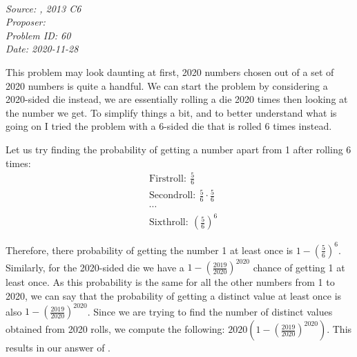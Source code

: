 \SSbreak\\
\emph{Source: \Chmmt, 2013 C6}\\
\emph{Proposer: \Pchan}\\
\emph{Problem ID: 60}\\
\emph{Date: 2020-11-28}\\
\SSbreak

\bigskip 

\begin{solution}\hfil\medskip
    
    This problem may look daunting at first, 2020 numbers chosen out of a set of 2020 numbers is quite a handful.
    We can start the problem by considering a 2020-sided die instead, we are essentially rolling a die 2020 times then looking at the number we get. To simplify things a bit, and to better understand what is going on I tried the problem with a 6-sided die that is rolled 6 times instead.\medskip

    Let us try finding the probability of getting a number apart from 1 after rolling 6 times:
    \begin{align*}
        &\mathrm{First roll:}\ \frac{5}{6}\\
        &\mathrm{Second roll:}\ \frac{5}{6}\cdot\frac{5}{6}\\
        &\cdots\\
        &\mathrm{Sixth roll:}\ \left(\frac{5}{6}\right)^6
    \end{align*}

    Therefore, there probability of getting the number 1 at least once is \(1-\left(\frac{5}{6}\right)^6\). Similarly, for the 2020-sided die we have a \(1-\left(\frac{2019}{2020}\right)^{2020}\) chance of getting 1 at least once. As this probability is the same for all the other numbers from 1 to 2020, we can say that the probability of getting a distinct value at least once is also \(1-\left(\frac{2019}{2020}\right)^{2020}\). Since we are trying to find the number of distinct values obtained from 2020 rolls, we compute the following: \(2020\left(1-\left(\frac{2019}{2020}\right)^{2020}\right)\). This results in our answer of .


\end{solution}